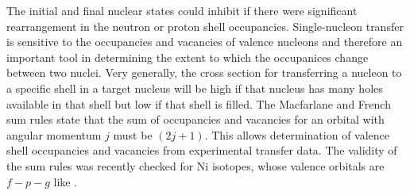 The initial and final nuclear states could inhibit \zvbb if there were significant rearrangement in the neutron or proton shell occupancies.  Single-nucleon transfer is sensitive to the occupancies and vacancies of valence nucleons and therefore an important tool in determining the extent to which the occupanices change between two nuclei.  Very generally, the cross section for transferring a nucleon to a specific shell in a target nucleus will be high if that nucleus has many holes available in that shell but low if that shell is filled.  The Macfarlane and French \citep{sumRules} sum rules state that the sum of occupancies and vacancies for an orbital with angular momentum $j$ must be $(2j+1)$.  This allows determination of valence shell occupancies and vacancies from experimental transfer data.  The validity of the sum rules was recently checked \cite{SumRulesTest} for Ni isotopes, whose valence orbitals are $f-p-g$ like \GeTargets.  

